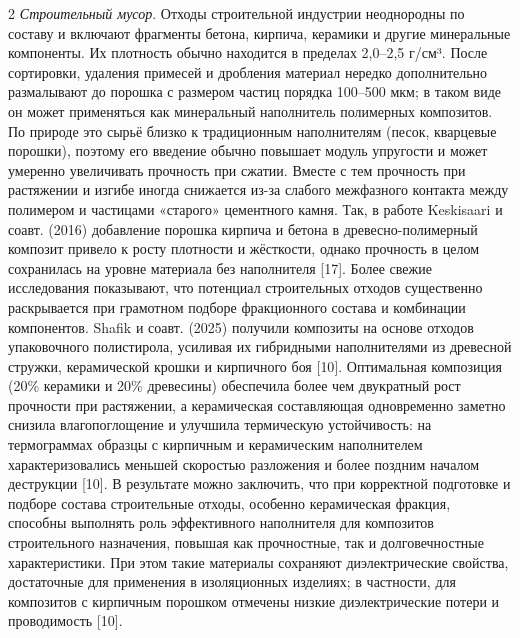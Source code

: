 \begin{multicols}{2}
\emph{Строительный мусор}. Отходы строительной индустрии
неоднородны по составу и включают фрагменты бетона, кирпича, керамики и
другие минеральные компоненты. Их плотность обычно находится в пределах
2,0--2,5 г/см³. После сортировки, удаления примесей и дробления материал
нередко дополнительно размалывают до порошка с размером частиц порядка
100--500 мкм; в таком виде он может применяться как минеральный
наполнитель полимерных композитов. По природе это сырьё близко к
традиционным наполнителям (песок, кварцевые порошки), поэтому его
введение обычно повышает модуль упругости и может умеренно увеличивать
прочность при сжатии. Вместе с тем прочность при растяжении и изгибе
иногда снижается из-за слабого межфазного контакта между полимером и
частицами «старого» цементного камня. Так, в работе Keskisaari и соавт.
(2016) добавление порошка кирпича и бетона в древесно-полимерный
композит привело к росту плотности и жёсткости, однако прочность в целом
сохранилась на уровне материала без наполнителя {[}17{]}. Более свежие
исследования показывают, что потенциал строительных отходов существенно
раскрывается при грамотном подборе фракционного состава и комбинации
компонентов. Shafik и соавт. (2025) получили композиты на основе отходов
упаковочного полистирола, усиливая их гибридными наполнителями из
древесной стружки, керамической крошки и кирпичного боя {[}10{]}.
Оптимальная композиция (20\% керамики и 20\% древесины) обеспечила более
чем двукратный рост прочности при растяжении, а керамическая
составляющая одновременно заметно снизила влагопоглощение и улучшила
термическую устойчивость: на термограммах образцы с кирпичным и
керамическим наполнителем характеризовались меньшей скоростью разложения
и более поздним началом деструкции {[}10{]}. В результате можно
заключить, что при корректной подготовке и подборе состава строительные
отходы, особенно керамическая фракция, способны выполнять роль
эффективного наполнителя для композитов строительного назначения,
повышая как прочностные, так и долговечностные характеристики. При этом
такие материалы сохраняют диэлектрические свойства, достаточные для
применения в изоляционных изделиях; в частности, для композитов с
кирпичным порошком отмечены низкие диэлектрические потери и проводимость
{[}10{]}.


\end{multicols}
